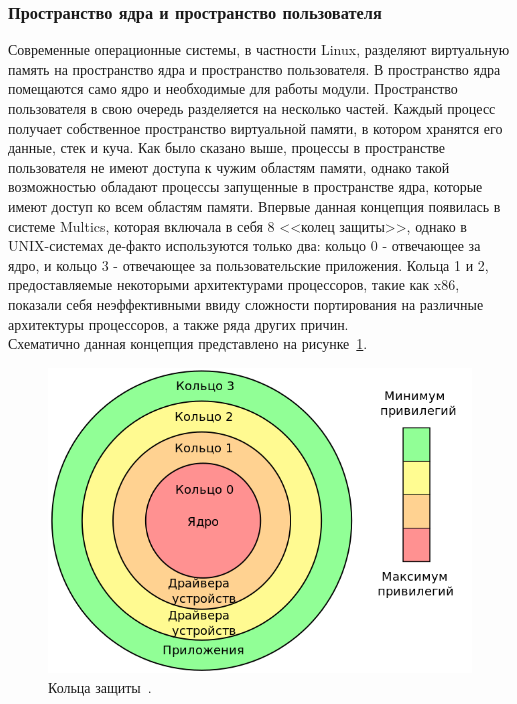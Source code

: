 \subsubsection{Пространство ядра и пространство пользователя}\label{subsec:----}
Современные операционные системы, в частности Linux, разделяют виртуальную память на пространство ядра и пространство пользователя.
В пространство ядра помещаются само ядро и необходимые для работы модули.
Пространство пользователя в свою очередь разделяется на несколько частей.
Каждый процесс получает собственное пространство виртуальной памяти, в котором хранятся его данные, стек и куча.
Как было сказано выше, процессы в пространстве пользователя не имеют доступа к чужим областям памяти, однако такой возможностью обладают процессы запущенные в пространстве ядра, которые имеют доступ ко всем областям памяти.
Впервые данная концепция появилась в системе Multics, которая включала в себя 8 <<колец защиты>>\footnotemark, однако в UNIX-системах де-факто используются только два: кольцо 0 - отвечающее за ядро, и кольцо 3 - отвечающее за пользовательские приложения.
Кольца 1 и 2, предоставляемые некоторыми архитектурами процессоров, такие как x86, показали себя неэффективными ввиду сложности портирования на различные архитектуры процессоров, а также ряда других причин.
\\
Схематично данная концепция представлено на рисунке~\ref{fig:rings}.


\begin{figure}[H]
    \centering
    \includegraphics[scale=0.5,width=\textwidth]{inc/img/rings}
    \caption{Кольца защиты~\cite{rings-pic}.}
    \label{fig:rings}
\end{figure}


